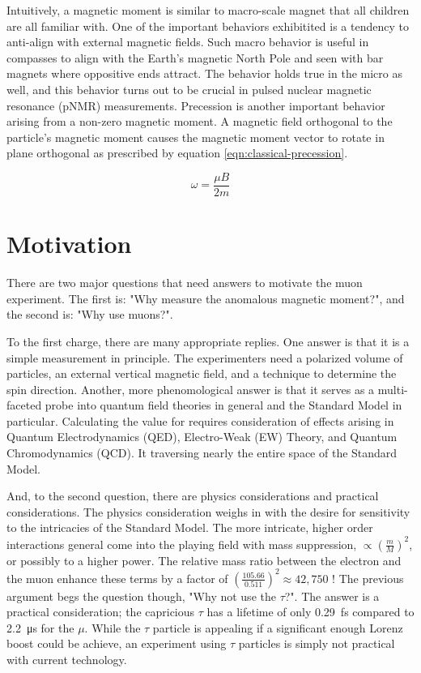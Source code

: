 Intuitively, a magnetic moment is similar to macro-scale magnet that all children are all familiar with.  One of the important behaviors exhibitited is a tendency to anti-align with external magnetic fields.  Such macro behavior is useful in compasses to align with the Earth's magnetic North Pole and seen with bar magnets where oppositive ends attract.  The behavior holds true in the micro as well, and this behavior turns out to be crucial in pulsed nuclear magnetic resonance (pNMR) measurements.  Precession is another important behavior arising from a non-zero magnetic moment.  A magnetic field orthogonal to the particle's magnetic moment causes the magnetic moment vector to rotate in plane orthogonal as prescribed by equation \ref{eqn:classical-precession}.

\begin{equation}
\label{eqn:classical-precession}
\omega = \frac{\mu B}{2 m}
\end{equation}

\section{Motivation}

There are two major questions that need answers to motivate the muon \gmtwo experiment.  The first is: "Why measure the anomalous magnetic moment?", and the second is: "Why use muons?".

To the first charge, there are many appropriate replies.  One answer is that it is a simple measurement in principle.  The experimenters need a polarized volume of particles, an external vertical magnetic field, and a technique to determine the spin direction. Another, more phenomological answer is that it serves as a multi-faceted probe into quantum field theories in general and the Standard Model in particular.  Calculating the value for \gmtwo requires consideration of effects arising in Quantum Electrodynamics (QED), Electro-Weak (EW) Theory, and Quantum Chromodynamics (QCD).  It traversing nearly the entire space of the Standard Model.

And, to the second question, there are physics considerations and practical considerations.  The physics consideration weighs in with the desire for sensitivity to the intricacies of the Standard Model.  The more intricate, higher order interactions general come into the playing field with mass suppression, $\propto (\frac{m}{M})^2$, or possibly to a higher power.  The relative mass ratio between the electron and the muon enhance these terms by a factor of $(\frac{105.66}{0.511})^2 \approx 42,750$ !  The previous argument begs the question though, "Why not use the $\tau$?".  The answer is a practical consideration; the capricious $\tau$ has a lifetime of only \SI{0.29}{\femto\second} compared to \SI{2.2}{\micro\second} for the $\mu$.  While the $\tau$ particle is appealing if a significant enough Lorenz boost could be achieve, an experiment using $\tau$ particles is simply not practical with current technology.

